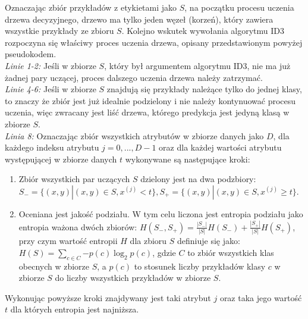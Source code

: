 \documentclass[
    left=2.5cm,         %
    right=2.5cm,        %
    top=2.5cm,          %
    bottom=3cm,         %
    bindingoffset=6mm,  %
    nohyphenation=false %
]{eiti/eiti-report}
\begin{document}
Oznaczając zbiór przykładów z etykietami jako $S$, na początku procesu uczenia drzewa decyzyjnego, drzewo ma tylko jeden węzeł (korzeń), który zawiera wszystkie przykłady ze zbioru $S$. Kolejno wskutek wywołania algorytmu ID3 rozpoczyna się właściwy proces uczenia drzewa, opisany przedstawionym powyżej pseudokodem.\\

\textit{Linie 1-2:}
Jeśli w zbiorze $S$, który był argumentem algorytmu ID3, nie ma już żadnej pary uczącej, proces dalszego uczenia drzewa należy zatrzymać.\\

\textit{Linie 4-6:}
Jeśli w zbiorze $S$ znajdują się przykłady należące tylko do jednej klasy, to znaczy że zbiór jest już idealnie podzielony i nie należy kontynuować procesu uczenia, więc zwracany jest liść drzewa, którego predykcja jest jedyną klasą w zbiorze $S$.\\

\textit{Linia 8:}
Oznaczając zbiór wszystkich atrybutów w zbiorze danych jako $D$, dla każdego indeksu atrybutu $j=0,...,D-1$ oraz dla każdej wartości atrybutu występującej w zbiorze danych $t$ wykonywane są następujące kroki:
\begin{enumerate}
  \item Zbiór wszystkich par uczących $S$ dzielony jest na dwa podzbiory: \begin{math}S_{-}=\{(x,y)|(x,y)\in{S}, x^{(j)}<t\}, S_{+}=\{(x,y)|(x,y)\in{S}, x^{(j)}\ge{t}\}\end{math}.
  \item Oceniana jest jakość podziału. W tym celu liczona jest entropia podziału jako entropia ważona dwóch zbiorów: \begin{math}H(S_{-}, S_{+})=\frac{|S_{-}|}{|S|}H(S_{-})+\frac{|S_{+}|}{|S|}H(S_{+})\end{math}, przy czym wartość entropii $H$ dla zbioru $S$ definiuje się jako: \begin{math}
      H(S)=\sum_{c\in{C}}{-p(c)\log_2p(c)}
  \end{math}, gdzie $C$ to zbiór wszystkich klas obecnych w zbiorze $S$, a $p(c)$ to stosunek liczby przykładów klasy $c$ w zbiorze $S$ do liczby wszystkich przykładów w zbiorze $S$. \\
\end{enumerate}


Wykonując powyższe kroki znajdywany jest taki atrybut $j$ oraz taka jego wartość $t$ dla których entropia jest najniższa.\\
\end{document}
